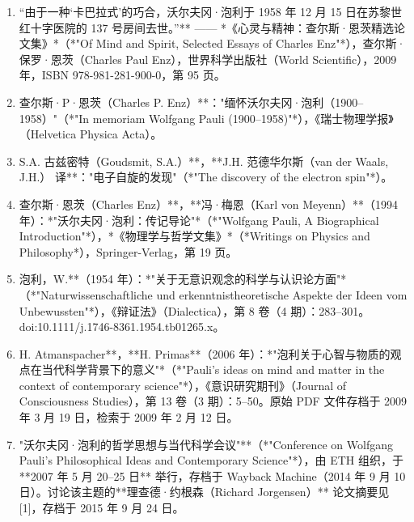 \begin{enumerate}
\item “由于一种‘卡巴拉式’的巧合，沃尔夫冈·泡利于 1958 年 12 月 15 日在苏黎世红十字医院的 137 号房间去世。”** —— *《心灵与精神：查尔斯·恩茨精选论文集》*（*"Of Mind and Spirit, Selected Essays of Charles Enz"*），查尔斯·保罗·恩茨（Charles Paul Enz），世界科学出版社（World Scientific），2009 年，ISBN 978-981-281-900-0，第 95 页。  
\item 查尔斯·P·恩茨（Charles P. Enz）**："缅怀沃尔夫冈·泡利（1900–1958）"（*"In memoriam Wolfgang Pauli (1900–1958)"*），《瑞士物理学报》（Helvetica Physica Acta）。  
\item S.A. 古兹密特（Goudsmit, S.A.）**，**J.H. 范德华尔斯（van der Waals, J.H.） 译**："电子自旋的发现"（*"The discovery of the electron spin"*）。  
\item 查尔斯·恩茨（Charles Enz）**，**冯·梅恩（Karl von Meyenn）**（1994 年）：*"沃尔夫冈·泡利：传记导论"*（*"Wolfgang Pauli, A Biographical Introduction"*），*《物理学与哲学文集》*（*Writings on Physics and Philosophy*），Springer-Verlag，第 19 页。  
\item 泡利，W.**（1954 年）：*"关于无意识观念的科学与认识论方面"*（*"Naturwissenschaftliche und erkenntnistheoretische Aspekte der Ideen vom Unbewussten"*），《辩证法》（Dialectica），第 8 卷（4 期）：283–301。doi:10.1111/j.1746-8361.1954.tb01265.x。  
\item H. Atmanspacher**，**H. Primas**（2006 年）：*"泡利关于心智与物质的观点在当代科学背景下的意义"*（*"Pauli's ideas on mind and matter in the context of contemporary science"*），《意识研究期刊》（Journal of Consciousness Studies），第 13 卷（3 期）：5–50。原始 PDF 文件存档于 2009 年 3 月 19 日，检索于 2009 年 2 月 12 日。  
\item "沃尔夫冈·泡利的哲学思想与当代科学会议"**（*"Conference on Wolfgang Pauli's Philosophical Ideas and Contemporary Science"*），由 ETH 组织，于 **2007 年 5 月 20–25 日** 举行，存档于 Wayback Machine（2014 年 9 月 10 日）。讨论该主题的**理查德·约根森（Richard Jorgensen）** 论文摘要见 [1]，存档于 2015 年 9 月 24 日。
\end{enumerate}